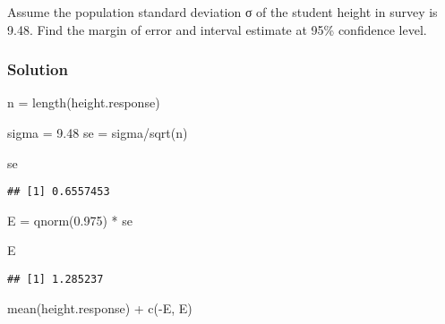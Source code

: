 \documentclass[
]{article}
\newenvironment{Shaded}{\begin{snugshade}}{\end{snugshade}}
\newcommand{\FloatTok}[1]{\textcolor[rgb]{0.00,0.00,0.81}{#1}}
\newcommand{\FunctionTok}[1]{\textcolor[rgb]{0.00,0.00,0.00}{#1}}
\newcommand{\NormalTok}[1]{#1}
\newcommand{\OtherTok}[1]{\textcolor[rgb]{0.56,0.35,0.01}{#1}}
\newcommand{\SpecialCharTok}[1]{\textcolor[rgb]{0.00,0.00,0.00}{#1}}
\begin{document}
Assume the population standard deviation σ of the student height in
survey is 9.48. Find the margin of error and interval estimate at 95\%
confidence level.

\hypertarget{solution-7}{%
\subsubsection{Solution}\label{solution-7}}

\begin{Shaded}
\end{Shaded}

\begin{Shaded}
\begin{Highlighting}[]
\NormalTok{n }\OtherTok{=} \FunctionTok{length}\NormalTok{(height.response)}

\NormalTok{sigma }\OtherTok{=} \FloatTok{9.48}
\NormalTok{se }\OtherTok{=}\NormalTok{ sigma}\SpecialCharTok{/}\FunctionTok{sqrt}\NormalTok{(n)}

\NormalTok{se}
\end{Highlighting}
\end{Shaded}

\begin{verbatim}
## [1] 0.6557453
\end{verbatim}

\begin{Shaded}
\begin{Highlighting}[]
\NormalTok{E }\OtherTok{=} \FunctionTok{qnorm}\NormalTok{(}\FloatTok{0.975}\NormalTok{) }\SpecialCharTok{*}\NormalTok{ se}

\NormalTok{E}
\end{Highlighting}
\end{Shaded}

\begin{verbatim}
## [1] 1.285237
\end{verbatim}

\begin{Shaded}
\begin{Highlighting}[]
\FunctionTok{mean}\NormalTok{(height.response) }\SpecialCharTok{+} \FunctionTok{c}\NormalTok{(}\SpecialCharTok{{-}}\NormalTok{E, E)}
\end{Highlighting}
\end{Shaded}
\end{document}
